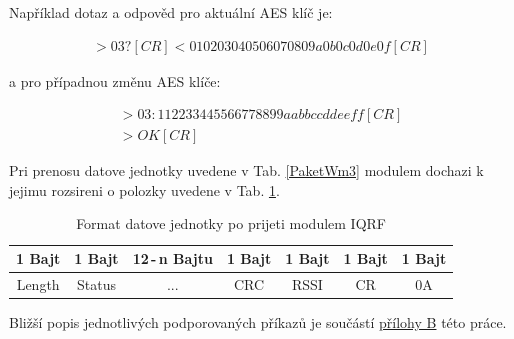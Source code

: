 Například dotaz a odpověd pro aktuální AES klíč je:

\begin{eqnarray}
	>03?[CR]
	<010203040506070809a0b0c0d0e0f[CR]
\end{eqnarray}

a pro případnou změnu AES klíče:

\begin{eqnarray}
>03:112233445566778899aabbccddeeff[CR]\\
>OK[CR]
\end{eqnarray}

Pri prenosu datove jednotky uvedene v Tab. \ref{PaketWm3} modulem dochazi k jejimu rozsireni o polozky uvedene v Tab. \ref{PaketWm4}.

\begin{table}[!h]
\centering
\begin{tabular}{ccccccc}
1 Bajt & 1 Bajt & 12\,-\,n Bajtu & 1 Bajt & 1 Bajt & 1 Bajt & 1 Bajt\\ \hline
\multicolumn{1}{|c|}{Length} & \multicolumn{1}{c|}{Status} & \multicolumn{1}{c|}{...} & \multicolumn{1}{c|}{CRC} & \multicolumn{1}{c|}{RSSI} & \multicolumn{1}{c|}{CR} & \multicolumn{1}{c|}{0A}\\ \hline
\end{tabular}
\caption{Format datove jednotky po prijeti modulem IQRF}
\label{PaketWm4}
\end{table}

Bližší popis jednotlivých podporovaných příkazů je součástí \hyperlink{prilohaB}{přílohy B} této práce.





